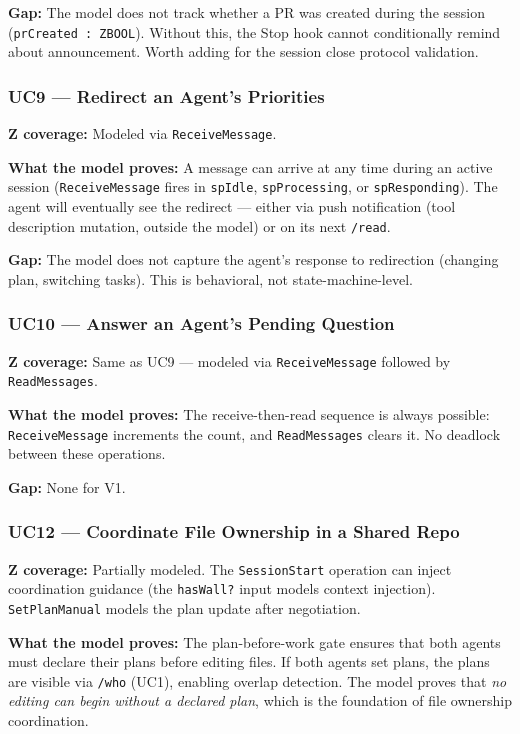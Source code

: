 \documentclass[a4paper,10pt,fleqn]{article}
\begin{document}
\textbf{Gap:} The model does not track whether a PR was created during
the session (\texttt{prCreated : ZBOOL}). Without this, the Stop hook
cannot conditionally remind about announcement. Worth adding for the
session close protocol validation.

\subsubsection{UC9 --- Redirect an Agent's Priorities}

\textbf{Z coverage:} Modeled via \texttt{ReceiveMessage}.

\textbf{What the model proves:} A message can arrive at any time during
an active session (\texttt{ReceiveMessage} fires in \texttt{spIdle},
\texttt{spProcessing}, or \texttt{spResponding}). The agent will
eventually see the redirect --- either via push notification (tool
description mutation, outside the model) or on its next \texttt{/read}.

\textbf{Gap:} The model does not capture the agent's response to
redirection (changing plan, switching tasks). This is behavioral, not
state-machine-level.

\subsubsection{UC10 --- Answer an Agent's Pending Question}

\textbf{Z coverage:} Same as UC9 --- modeled via \texttt{ReceiveMessage}
followed by \texttt{ReadMessages}.

\textbf{What the model proves:} The receive-then-read sequence is
always possible: \texttt{ReceiveMessage} increments the count, and
\texttt{ReadMessages} clears it. No deadlock between these operations.

\textbf{Gap:} None for V1.

\subsubsection{UC12 --- Coordinate File Ownership in a Shared Repo}

\textbf{Z coverage:} Partially modeled. The \texttt{SessionStart}
operation can inject coordination guidance (the \texttt{hasWall?} input
models context injection). \texttt{SetPlanManual} models the plan update
after negotiation.

\textbf{What the model proves:} The plan-before-work gate ensures that
both agents must declare their plans before editing files. If both agents
set plans, the plans are visible via \texttt{/who} (UC1), enabling
overlap detection. The model proves that \emph{no editing can begin
without a declared plan}, which is the foundation of file ownership
coordination.
\end{document}
